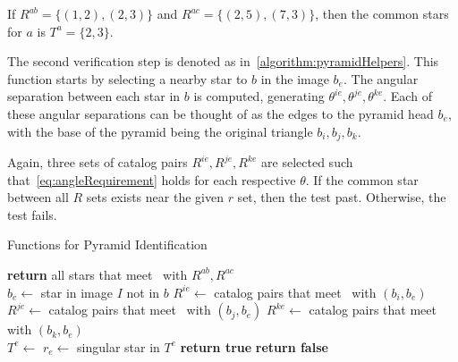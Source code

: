 If $R^{ab} = \{ (1, 2), (2, 3) \}$ and $R^{ac} = \{ (2, 5), (7, 3) \}$, then the common stars for $a$ is
$T^a = \{2, 3\}$.


The second verification step is denoted as  in~\autoref{algorithm:pyramidHelpers}.
This function starts by selecting a nearby star to $b$ in the image $b_e$.
The angular separation between each star in $b$ is computed, generating $\theta^{ie}, \theta^{je},
\theta^{ke}$.
Each of these angular separations can be thought of as the edges to the pyramid head $b_e$, with the base of the pyramid
being the original triangle $b_i, b_j, b_k$.

Again, three sets of catalog pairs $R^{ie}, R^{je}, R^{ke}$ are selected such that~\autoref{eq:angleRequirement} holds
for each respective $\theta$.
If the common star between all $R$ sets exists near the given $r$ set, then the test past.
Otherwise, the test fails.

\begin{algorithm} 
    \caption{Functions for Pyramid Identification} \label{algorithm:pyramidHelpers}
    \begin{algorithmic}[1]
        \State \textbf{return} all stars that meet~ with $R^{ab}, R^{ac}$
        \EndFunction
        \\
        \State $b_e \gets $ star in image $I$ not in $b$
        \State $R^{ie} \gets$ catalog pairs that meet~ with $(b_i, b_e)$
        \State $R^{je} \gets$ catalog pairs that meet~ with $(b_j, b_e)$
        \State $R^{ke} \gets$ catalog pairs that meet~ with $(b_k, b_e)$
        \\
        \State $T^e \gets $ 
        \State $r_e \gets $ singular star in $T^e$
        \State \textbf{return true}
        \EndIf
        \EndIf
        \State \textbf{return false}
        \EndFunction
    \end{algorithmic}
\end{algorithm}

